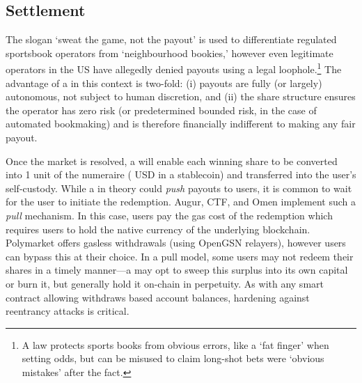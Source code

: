 




\subsection{Settlement}\label{wf:clear}

The slogan `sweat the game, not the payout' is used to differentiate regulated sportsbook operators from `neighbourhood bookies,' however even legitimate operators in the US have allegedly denied payouts using a legal loophole.\footnote{A law protects sports books from obvious errors, like a `fat finger' when setting odds, but can be misused to claim long-shot bets were `obvious mistakes' after the fact.} The advantage of a \depm in this context is two-fold: (i) payouts are fully (or largely) autonomous, not subject to human discretion, and (ii) the share structure ensures the operator has zero risk (or predetermined bounded risk, in the case of automated bookmaking) and is therefore financially indifferent to making any fair payout.


Once the market is resolved, a \depm will enable each winning share to be converted into 1 unit of the numeraire ( USD in a stablecoin) and transferred into the user's self-custody. While a \depm in theory could \textit{push} payouts to users, it is common to wait for the user to initiate the redemption. Augur, CTF, and Omen implement such a \textit{pull} mechanism. In this case, users pay the gas cost of the redemption which requires users to hold the native currency of the underlying blockchain. Polymarket offers gasless withdrawals (using OpenGSN relayers), however users can bypass this at their choice. In a pull model, some users may not redeem their shares in a timely manner---a \depm may opt to sweep this surplus into its own capital or burn it, but \depms generally hold it on-chain in perpetuity. As with any smart contract allowing withdraws based account balances, hardening against reentrancy attacks is critical.



